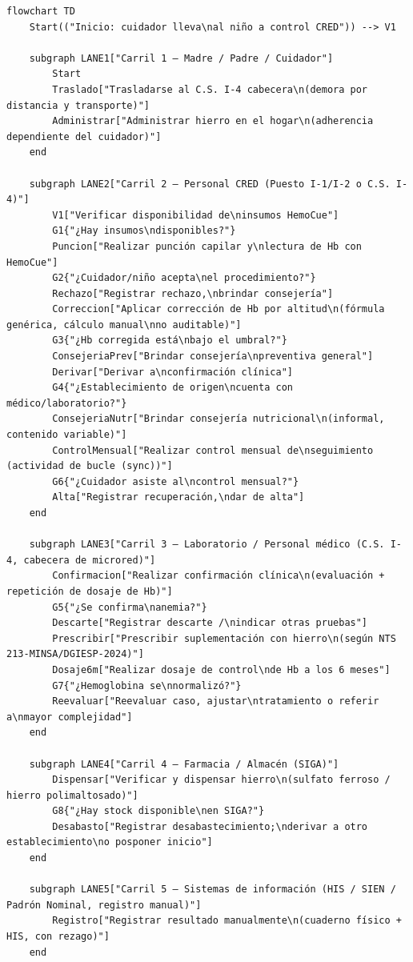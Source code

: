 \documentclass[11pt,a4paper]{article}
\begin{document}
\begin{samepage}\begin{verbatim}
flowchart TD
    Start(("Inicio: cuidador lleva\nal niño a control CRED")) --> V1

    subgraph LANE1["Carril 1 — Madre / Padre / Cuidador"]
        Start
        Traslado["Trasladarse al C.S. I-4 cabecera\n(demora por distancia y transporte)"]
        Administrar["Administrar hierro en el hogar\n(adherencia dependiente del cuidador)"]
    end

    subgraph LANE2["Carril 2 — Personal CRED (Puesto I-1/I-2 o C.S. I-4)"]
        V1["Verificar disponibilidad de\ninsumos HemoCue"]
        G1{"¿Hay insumos\ndisponibles?"}
        Puncion["Realizar punción capilar y\nlectura de Hb con HemoCue"]
        G2{"¿Cuidador/niño acepta\nel procedimiento?"}
        Rechazo["Registrar rechazo,\nbrindar consejería"]
        Correccion["Aplicar corrección de Hb por altitud\n(fórmula genérica, cálculo manual\nno auditable)"]
        G3{"¿Hb corregida está\nbajo el umbral?"}
        ConsejeriaPrev["Brindar consejería\npreventiva general"]
        Derivar["Derivar a\nconfirmación clínica"]
        G4{"¿Establecimiento de origen\ncuenta con médico/laboratorio?"}
        ConsejeriaNutr["Brindar consejería nutricional\n(informal, contenido variable)"]
        ControlMensual["Realizar control mensual de\nseguimiento (actividad de bucle (sync))"]
        G6{"¿Cuidador asiste al\ncontrol mensual?"}
        Alta["Registrar recuperación,\ndar de alta"]
    end

    subgraph LANE3["Carril 3 — Laboratorio / Personal médico (C.S. I-4, cabecera de microred)"]
        Confirmacion["Realizar confirmación clínica\n(evaluación + repetición de dosaje de Hb)"]
        G5{"¿Se confirma\nanemia?"}
        Descarte["Registrar descarte /\nindicar otras pruebas"]
        Prescribir["Prescribir suplementación con hierro\n(según NTS 213-MINSA/DGIESP-2024)"]
        Dosaje6m["Realizar dosaje de control\nde Hb a los 6 meses"]
        G7{"¿Hemoglobina se\nnormalizó?"}
        Reevaluar["Reevaluar caso, ajustar\ntratamiento o referir a\nmayor complejidad"]
    end

    subgraph LANE4["Carril 4 — Farmacia / Almacén (SIGA)"]
        Dispensar["Verificar y dispensar hierro\n(sulfato ferroso / hierro polimaltosado)"]
        G8{"¿Hay stock disponible\nen SIGA?"}
        Desabasto["Registrar desabastecimiento;\nderivar a otro establecimiento\no posponer inicio"]
    end

    subgraph LANE5["Carril 5 — Sistemas de información (HIS / SIEN / Padrón Nominal, registro manual)"]
        Registro["Registrar resultado manualmente\n(cuaderno físico + HIS, con rezago)"]
    end


\end{verbatim}
\end{samepage}
\end{document}
